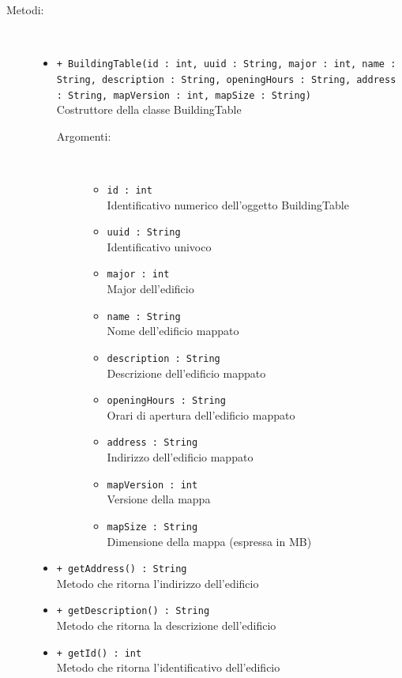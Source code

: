 \documentclass[../DefinizioneDiProdotto.tex]{subfiles}
\begin{document}
\begin{description}
\begin{itemize}
	\end{itemize}
	\item[Metodi:] \
	\begin{itemize}
		\item \texttt{+ BuildingTable(id : int, uuid : String, major : int, name : String, description : String, openingHours : String, address : String, mapVersion : int, mapSize : String)}\\
		Costruttore della classe BuildingTable
		\begin{description}
			\item[Argomenti:] \
			\begin{itemize}
				\item \texttt{id : int}\\
				Identificativo numerico dell'oggetto BuildingTable\item \texttt{uuid : String}\\
				Identificativo univoco\item \texttt{major : int}\\
				Major dell'edificio\item \texttt{name : String}\\
				Nome dell'edificio mappato\item \texttt{description : String}\\
				Descrizione dell'edificio mappato\item \texttt{openingHours : String}\\
				Orari di apertura dell'edificio mappato\item \texttt{address : String}\\
				Indirizzo dell'edificio mappato\item \texttt{mapVersion : int}\\
				Versione della mappa\item \texttt{mapSize : String}\\
				Dimensione della mappa (espressa in MB)\end{itemize}
		\end{description}
		\item \texttt{+ getAddress() : String}\\
		Metodo che ritorna l'indirizzo dell'edificio
		\item \texttt{+ getDescription() : String}\\
		Metodo che ritorna la descrizione dell'edificio
		\item \texttt{+ getId() : int}\\
		Metodo che ritorna l'identificativo dell'edificio

\end{itemize}
\end{description}
\end{document}
